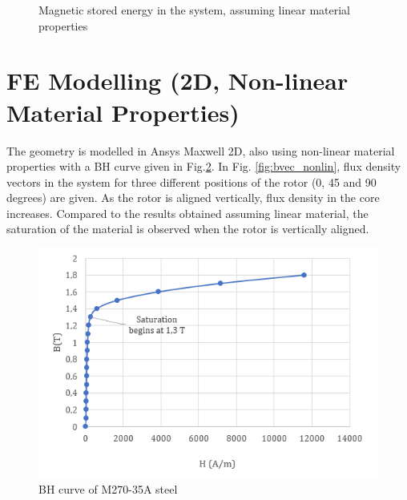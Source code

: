 \documentclass{reportClass}
\begin{document}
\begin{figure}[h!]
    \centering
       \hspace{0.5cm}

  \caption{Magnetic stored energy in the system, assuming linear material properties}
  \label{fig:energy_lin} 
\end{figure}



\section{FE Modelling (2D, Non-linear Material Properties)}


The geometry is modelled in Ansys Maxwell 2D, also using non-linear material properties with a BH curve given in Fig.\ref{fig:bh}. In Fig. \ref{fig:bvec_nonlin}, flux density vectors in the system for three different positions of the rotor (0, 45 and 90 degrees) are given. As the rotor is aligned vertically, flux density in the core increases. Compared to the results obtained assuming linear material, the saturation of the material is observed when the rotor is vertically aligned.\\

\begin{figure}[h!]
\centering
\includegraphics[width=0.6\linewidth]{bh_curve_m270_35a.png}
\caption{BH curve of M270-35A steel}
\label{fig:bh}
\end{figure}
\end{document}

